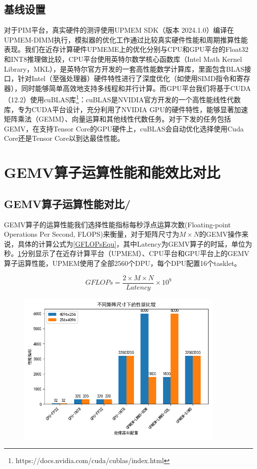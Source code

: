 \subsection{基线设置}
对于PIM平台，真实硬件的测评使用UPMEM SDK（版本 2024.1.0）编译在UPMEM-DIMM执行，模拟器的优化工作通过比较真实硬件性能和周期推算性能表现。我们在近存计算硬件UPMEME上的优化分别与CPU和GPU平台的Float32和INT8推理做比较，CPU平台使用英特尔数学核心函数库（Intel Math Kernel Library，MKL）\cite{IntelMKL}，是英特尔官方开发的一套高性能数学计算库，里面包含BLAS接口，针对Intel（至强处理器）硬件特性进行了深度优化（如使用SIMD指令和寄存器），同时能够简单高效地支持多线程和并行计算。而GPU平台我们将基于CUDA（12.2）使用cuBLAS库\footnote{https://docs.nvidia.com/cuda/cublas/index.html}：cuBLAS是NVIDIA官方开发的一个高性能线性代数库，专为CUDA平台设计，充分利用了NVIDIA GPU的硬件特性，能够显著加速矩阵乘法（GEMM）、向量运算和其他线性代数任务。对于下发的任务包括GEMV，在支持Tensor Core的GPU硬件上，cuBLAS会自动优化选择使用Cuda Core还是Tensor Core以到达最佳性能。

\section{GEMV算子运算性能和能效比对比}

\subsection{GEMV算子运算性能对比/}
GEMV算子的运算性能我们选择性能指标每秒浮点运算次数(Floating-point Operations Per Second, FLOPS)来衡量，对于矩阵尺寸为$M\times N$的GEMV操作来说，具体的计算公式为\ref{GFLOPsEqu}，其中Latency为GEMV算子的时延，单位为秒。\ref{EXP1-1}分别显示了在近存计算平台（UPMEM）、CPU平台和GPU平台上的GEMV算子运算性能，UPMEM使用了全部2560个DPU，每个DPU配置16个tasklet。

\begin{equation}
    GFLOPs=\frac{2\times M\times N}{Latency}\times 10^9
    \label{GFLOPsEqu}
\end{equation}

\begin{figure}[!htbp]
    \centering
    \includegraphics[width=0.9\textwidth]{figures/Exp1-1.png}
    \caption{}
	\label{EXP1-1} %
\end{figure}

